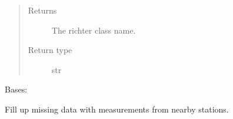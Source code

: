 \documentclass[letterpaper,10pt,english]{sphinxmanual}
\begin{document}
\begin{fulllineitems}
\begin{fulllineitems}
\begin{quote}
\begin{description}
\item[{Returns}] \leavevmode
\sphinxAtStartPar
The richter class name.

\item[{Return type}] \leavevmode
\sphinxAtStartPar
str

\end{description}\end{quote}

\end{fulllineitems}


\end{fulllineitems}


\begin{fulllineitems}
\label{\detokenize{weatherDB:weatherDB.station.StationBase}}
\sphinxAtStartPar
Bases: 

\begin{fulllineitems}
\label{\detokenize{weatherDB:weatherDB.station.StationBase.__init__}}
\end{fulllineitems}


\begin{fulllineitems}
\label{\detokenize{weatherDB:weatherDB.station.StationBase.download_raw}}
\end{fulllineitems}


\begin{fulllineitems}
\label{\detokenize{weatherDB:weatherDB.station.StationBase.fillup}}
\sphinxAtStartPar
Fill up missing data with measurements from nearby stations.


\end{fulllineitems}
\end{fulllineitems}
\end{document}
